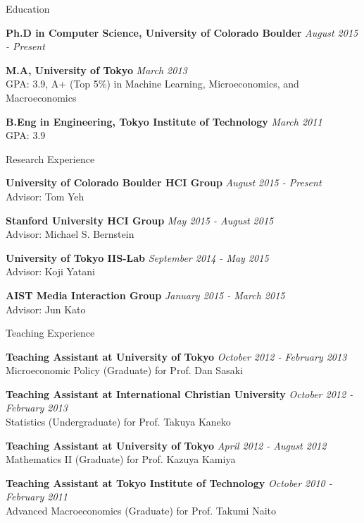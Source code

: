 \documentclass{resume} %
\begin{document}
\begin{rSection}{Education}

{\bf Ph.D in Computer Science, University of Colorado Boulder} \hfill {\em August 2015 - Present}

{\bf M.A, University of Tokyo} \hfill {\em March 2013} \\ 
GPA: 3.9, A+ (Top 5\%) in Machine Learning, Microeconomics, and Macroeconomics 

{\bf B.Eng in Engineering, Tokyo Institute of Technology} \hfill {\em March 2011} \\
GPA: 3.9


\end{rSection}



\begin{rSection}{Research Experience}

{\bf University of Colorado Boulder HCI Group} \hfill {\em August 2015 - Present} \\ 
Advisor: Tom Yeh

{\bf Stanford University HCI Group} \hfill {\em May 2015 - August 2015} \\ 
Advisor: Michael S. Bernstein 

{\bf University of Tokyo IIS-Lab} \hfill {\em September 2014 - May 2015} \\ 
Advisor: Koji Yatani

{\bf AIST Media Interaction Group} \hfill {\em January 2015 - March 2015} \\ 
Advisor: Jun Kato

\end{rSection}



\begin{rSection}{Teaching Experience}

{\bf Teaching Assistant at University of Tokyo} \hfill {\em October 2012 - February 2013} \\ 
Microeconomic Policy (Graduate) for Prof. Dan Sasaki 

{\bf Teaching Assistant at International Christian University} \hfill {\em October 2012 - February 2013} \\ 
Statistics (Undergraduate) for Prof. Takuya Kaneko 

{\bf Teaching Assistant at University of Tokyo} \hfill {\em April 2012 - August 2012} \\ 
Mathematics II (Graduate) for Prof. Kazuya Kamiya 

{\bf Teaching Assistant at Tokyo Institute of Technology} \hfill {\em October 2010 - February 2011} \\ 
Advanced Macroeconomics (Graduate) for Prof. Takumi Naito

\end{rSection}
\end{document}
